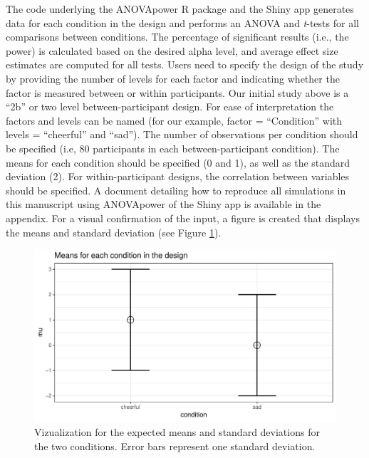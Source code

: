 \documentclass[,jou,floatsintext]{apa6}
\begin{document}
The code underlying the ANOVApower R package and the Shiny app generates data for each condition in the design and performs an ANOVA and \emph{t}-tests for all comparisons between conditions.
The percentage of significant results (i.e., the power) is calculated based on the desired alpha level, and average effect size estimates are computed for all tests.
Users need to specify the design of the study by providing the number of levels for each factor and indicating whether the factor is measured between or within participants.
Our initial study above is a \enquote{2b} or two level between-participant design.
For ease of interpretation the factors and levels can be named (for our example, factor = \enquote{Condition} with levels = \enquote{cheerful} and \enquote{sad}).
The number of observations per condition should be specified (i.e, 80 participants in each between-participant condition).
The means for each condition should be specified (0 and 1), as well as the standard deviation (2).
For within-participant designs, the correlation between variables should be specified.
A document detailing how to reproduce all simulations in this manuscript using ANOVApower of the Shiny app is available in the appendix.
For a visual confirmation of the input, a figure is created that displays the means and standard deviation (see Figure \ref{fig:mean-plot2}).

\begin{figure}
\centering
\includegraphics{0.1_Simulation_Based_Power_Analysis_For_Factorial_ANOVA_Designs_files/figure-latex/mean-plot2-1.pdf}
\caption{\label{fig:mean-plot2}Vizualization for the expected means and standard deviations for the two conditions. Error bars represent one standard deviation.}
\end{figure}
\end{document}
